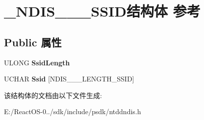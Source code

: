 \hypertarget{struct___n_d_i_s__802__11___s_s_i_d}{}\section{\+\_\+\+N\+D\+I\+S\+\_\+\_\+\_\+\+S\+S\+I\+D结构体 参考}
\label{struct___n_d_i_s__802__11___s_s_i_d}
\subsection*{Public 属性}
\begin{DoxyCompactItemize}
\item 
\mbox{\label{struct___n_d_i_s__802__11___s_s_i_d_a73800ea8018c438b3ff5700d032cf467}} 
U\+L\+O\+NG {\bfseries Ssid\+Length}
\item 
\mbox{\label{struct___n_d_i_s__802__11___s_s_i_d_a66fcb12c51bde2ba976a6bf443185945}} 
U\+C\+H\+AR {\bfseries Ssid} \mbox{[}N\+D\+I\+S\+\_\+\_\+\_\+\+L\+E\+N\+G\+T\+H\+\_\+\+S\+S\+ID\mbox{]}
\end{DoxyCompactItemize}


该结构体的文档由以下文件生成\+:\begin{DoxyCompactItemize}
\item 
E\+:/\+React\+O\+S-\/0../sdk/include/psdk/ntddndis.\+h\end{DoxyCompactItemize}
